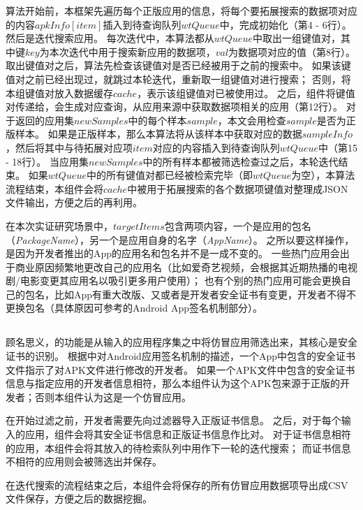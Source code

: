 算法开始前，本框架先遍历每个正版应用的信息，将每个要拓展搜索的数据项对应的内容$apkInfo[item]$插入到待查询队列$wtQueue$中，完成初始化（第4 - 6行）。
然后是迭代搜索应用。
每次迭代中，本算法都从$wtQueue$中取出一组键值对，其中键$key$为本次迭代中用于搜索新应用的数据项，$val$为数据项对应的值（第8行）。
取出键值对之后，算法先检查该键值对是否已经被用于之前的搜索中。
如果该键值对之前已经出现过，就跳过本轮迭代，重新取一组键值对进行搜索；
否则，将本组键值对放入数据缓存$cache$，表示该组键值对已被使用过。
之后，组件将键值对传递给\componentA ，\componentA 会生成对应查询，从应用来源中获取数据项相关的应用（第12行）。
对于\componentA 返回的应用集$newSamples$中的每个样本$sample$，本文会用\componentC 检查$sample$是否为正版样本。
如果是正版样本，那么本算法将从该样本中获取对应的数据$sampleInfo$，然后将其中与待拓展对应项$item$对应的内容插入到待查询队列$wtQueue$中（第15 - 18行）。
当应用集$newSamples$中的所有样本都被筛选检查过之后，本轮迭代结束。
如果$wtQueue$中的所有键值对都已经被检索完毕（即$wtQueue$为空），本算法流程结束，本组件会将$cache$中被用于拓展搜索的各个数据项键值对整理成JSON文件输出，方便之后的再利用。

在本次实证研究场景中，$targetItems$包含两项内容，一个是应用的包名（\emph{PackageName}），另一个是应用自身的名字（\emph{AppName}）。
之所以要这样操作，是因为开发者推出的App的应用名和包名并不是一成不变的。
一些热门应用会出于商业原因频繁地更改自己的应用名（比如爱奇艺视频，会根据其近期热播的电视剧/电影变更其应用名以吸引更多用户使用）；
也有个别的热门应用可能会更换自己的包名，比如App有重大改版、又或者是开发者安全证书有变更，开发者不得不更换包名（具体原因可参考的Android App签名机制部分）。

\subsection{\componentC }
顾名思义，\componentC 的功能是从输入的应用程序集之中将仿冒应用筛选出来，其核心是安全证书的识别。
根据中对Android应用签名机制的描述，一个App中包含的安全证书文件指示了对APK文件进行修改的开发者。
如果一个APK文件中包含的安全证书信息与指定应用的开发者信息相符，那么本组件认为这个APK包来源于正版的开发者；否则本组件认为这是一个仿冒应用。

在开始过滤之前，开发者需要先向过滤器导入正版证书信息。
之后，对于每个输入的应用，组件会将其安全证书信息和正版证书信息作比对。
对于证书信息相符的应用，本组件会将其放入\componentB 的待检索队列中用作下一轮的迭代搜索；
而证书信息不相符的应用则会被筛选出并保存。

在迭代搜索的流程结束之后，本组件会将保存的所有仿冒应用数据项导出成CSV文件保存，方便之后的数据挖掘。


